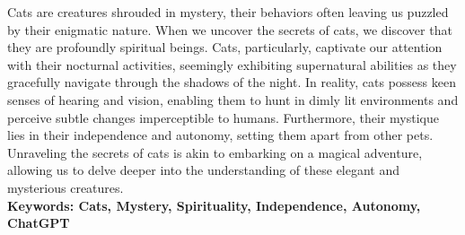 Cats are creatures shrouded in mystery, their behaviors often leaving us puzzled by their enigmatic nature. When we uncover the secrets of cats, we discover that they are profoundly spiritual beings. Cats, particularly, captivate our attention with their nocturnal activities, seemingly exhibiting supernatural abilities as they gracefully navigate through the shadows of the night. In reality, cats possess keen senses of hearing and vision, enabling them to hunt in dimly lit environments and perceive subtle changes imperceptible to humans. Furthermore, their mystique lies in their independence and autonomy, setting them apart from other pets. Unraveling the secrets of cats is akin to embarking on a magical adventure, allowing us to delve deeper into the understanding of these elegant and mysterious creatures.
~ \\

\noindent\textbf{Keywords: Cats, Mystery, Spirituality, Independence, Autonomy, ChatGPT}